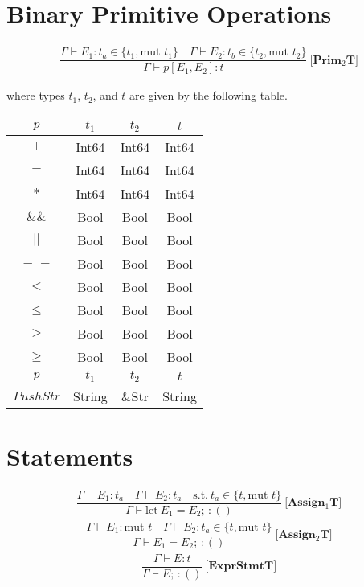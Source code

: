 \documentclass[11pt]{article}
\begin{document}
    \section*{Binary Primitive Operations}
    \begin{align*}
        \dfrac{\Gamma \vdash E_1 : t_a \in \{t_1, \text{mut }t_1\} \quad \Gamma \vdash E_2 : t_b \in \{t_2, \text{mut }t_2\}}{\Gamma \vdash p[E_1,E_2] : t} \ \textbf{[Prim$_2$T]}
    \end{align*}

    \begin{flushleft}
        where types $t_1$, $t_2$, and $t$ are given by the following table. \newline

        \begin{tabular}{|c|c|c|c|}
            \hline
            $p$ & $t_1$ & $t_2$ & $t$ \\ \hline
            $+$ & Int64 & Int64 & Int64 \\ \hline
            $-$ & Int64 & Int64 & Int64 \\ \hline
            $*$ & Int64 & Int64 & Int64 \\ \hline
            $\&\&$ & Bool & Bool & Bool \\ \hline
            $||$ & Bool & Bool & Bool \\ \hline
            $==$ & Bool & Bool & Bool \\ \hline
            $<$ & Bool & Bool & Bool \\ \hline
            $\leq$ & Bool & Bool & Bool \\ \hline
            $>$ & Bool & Bool & Bool \\ \hline
            $\geq$ & Bool & Bool & Bool \\ \hline
            $p$ & $t_1$ & $t_2$ & $t$ \\ \hline
            $PushStr$ & String & \&Str & String \\ \hline
        \end{tabular}
    \end{flushleft}

    \section*{Statements}
    \begin{align*}
        \dfrac{\Gamma \vdash E_1: t_a \quad \Gamma \vdash E_2 : t_a \quad \text{s.t.} \ t_a \in \{t, \text{mut }t\}}
        {\Gamma \vdash \text{let} \ E_1 = E_2; \, : ()} \ \textbf{[Assign$_1$T]}
    \end{align*}
    \begin{align*}
        \dfrac{\Gamma \vdash E_1: \text{mut } t \quad \Gamma \vdash E_2 : t_a \in \{t, \text{mut }t\}}
        {\Gamma \vdash E_1 = E_2; \, : ()} \ \textbf{[Assign$_2$T]}
    \end{align*}
    \begin{align*}
        \dfrac{\Gamma \vdash E: t}{\Gamma \vdash E; \, : ()} \ \textbf{[ExprStmtT]}
    \end{align*}
\end{document}
